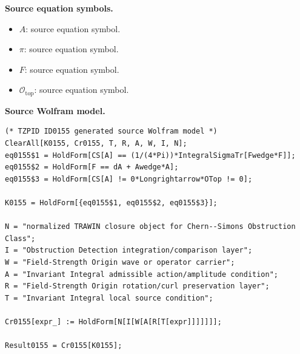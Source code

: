 \begin{minipage}[t]{0.49\linewidth}
\begingroup
\small
\raggedright
\textbf{Source equation symbols.}\par
\begin{itemize}[leftmargin=1.35em,itemsep=1pt,topsep=1pt,parsep=0pt]
    \item $A$: source equation symbol.
    \item $\pi$: source equation symbol.
    \item $F$: source equation symbol.
    \item $\mathcal{O}_{\mathrm{top}}$: source equation symbol.
\end{itemize}
\endgroup
\end{minipage}\hfill
\begin{minipage}[t]{0.47\linewidth}
\begingroup
\scriptsize
\raggedright
\textbf{Source Wolfram model.}\par
\begin{Verbatim}[fontsize=\tiny,breaklines=true,breakanywhere=true]
(* TZPID ID0155 generated source Wolfram model *)
ClearAll[K0155, Cr0155, T, R, A, W, I, N];
eq0155$1 = HoldForm[CS[A] == (1/(4*Pi))*IntegralSigmaTr[Fwedge*F]];
eq0155$2 = HoldForm[F == dA + Awedge*A];
eq0155$3 = HoldForm[CS[A] != 0*Longrightarrow*OTop != 0];

K0155 = HoldForm[{eq0155$1, eq0155$2, eq0155$3}];

N = "normalized TRAWIN closure object for Chern--Simons Obstruction Class";
I = "Obstruction Detection integration/comparison layer";
W = "Field-Strength Origin wave or operator carrier";
A = "Invariant Integral admissible action/amplitude condition";
R = "Field-Strength Origin rotation/curl preservation layer";
T = "Invariant Integral local source condition";

Cr0155[expr_] := HoldForm[N[I[W[A[R[T[expr]]]]]]];

Result0155 = Cr0155[K0155];
\end{Verbatim}
\endgroup
\end{minipage}

